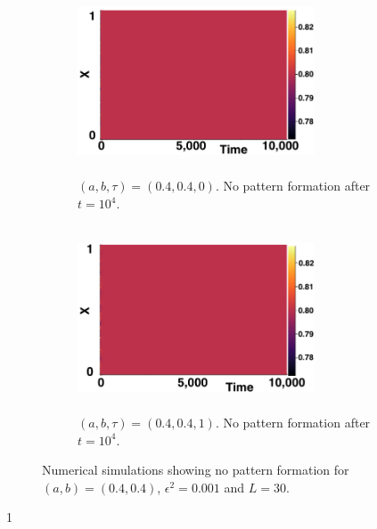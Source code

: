 \begin{figure}[H]
    \centering
    \begin{subfigure}[b]{0.45\textwidth}
        \centering
        \includegraphics[width=7cm,height = 5.5cm]{nopatt1.png}
        \caption{$(a,b,\tau)=(0.4,0.4,0)$. No pattern formation after $t=10^4$. }
        \label{}
    \end{subfigure}
    \hfill
    \begin{subfigure}[b]{0.45\textwidth}
        \centering
        \includegraphics[width=7cm,height = 5.5cm]{nopatt2.png}
        \caption{$(a,b,\tau)=(0.4,0.4,1)$. No pattern formation after $t=10^4$.}
        \label{}
    \end{subfigure}
    \caption{Numerical simulations showing no pattern formation for $(a,b)=(0.4,0.4)$, $\epsilon^2=0.001$ and $L=30$.}
    \label{fig:fixedsim1}
\end{figure}1

